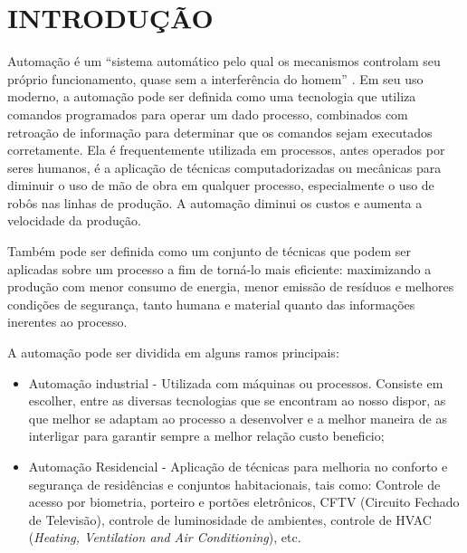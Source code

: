 \documentclass[
12pt,
openany, %
oneside, %
a4paper,			
english,			
brazil			        %
]{abntbibufjf}
\begin{document}
	
	
	
	
 	
	
	
	
	
	\tableofcontents*
	\cleardoublepage
	
	
	
	\textual
	\pagestyle{simple}   
	
	
	\chapter{INTRODUÇÃO} 
	\label{cap1}
	
	Automação é um “sistema automático pelo qual os mecanismos controlam seu próprio funcionamento, quase sem a interferência do homem” \cite{FERREIRA}. Em seu uso moderno, a automação pode ser definida como uma tecnologia que utiliza comandos programados para operar um dado processo, combinados com retroação de informação para determinar que os comandos sejam executados corretamente. Ela é frequentemente utilizada em processos, antes operados por seres humanos, é a aplicação de técnicas computadorizadas ou mecânicas para diminuir o uso de mão de obra em qualquer processo, especialmente o uso de robôs nas linhas de produção. A automação diminui os custos e aumenta a velocidade da produção.
	
	Também pode ser definida como um conjunto de técnicas que podem ser aplicadas sobre um processo a fim de torná-lo mais eficiente: maximizando a produção com menor consumo de energia, menor emissão de resíduos e melhores condições de segurança, tanto humana e material quanto das informações inerentes ao processo.
	
	A automação pode ser dividida em alguns ramos principais:

\begin{itemize}
    \item Automação industrial - Utilizada com máquinas ou processos. Consiste em escolher, entre as diversas tecnologias que se encontram ao nosso dispor, as que melhor se adaptam ao processo a desenvolver e a melhor maneira de as interligar para garantir sempre a melhor relação custo beneficio;
    \item Automação Residencial - Aplicação de técnicas para melhoria no conforto e segurança de residências e conjuntos habitacionais, tais como: Controle de acesso por biometria, porteiro e portões eletrônicos, CFTV (Circuito Fechado de Televisão), controle de luminosidade de ambientes, controle de HVAC (\textit{Heating, Ventilation and Air Conditioning}), etc.
\end{itemize}
\end{document}
